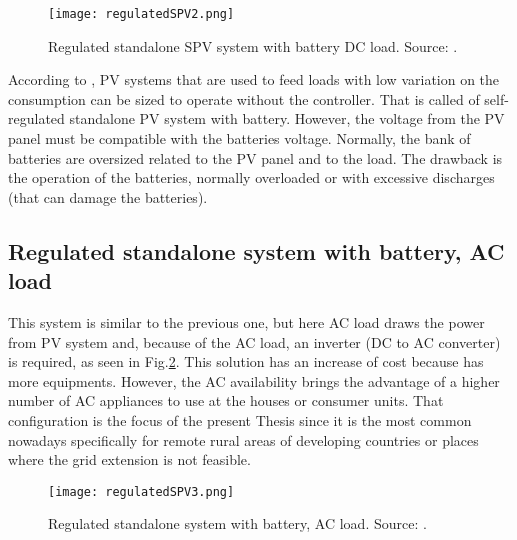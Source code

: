 \begin{figure}[h]
\texttt{[image: regulatedSPV2.png]}
\centering
\caption{Regulated standalone SPV system with battery DC load. Source: \cite{Roy}.}
\label{fig:regSPV2}
\end{figure}

According to \cite{Pinho}, PV systems that are used to feed loads with low variation on the consumption can be sized to operate without the controller. That is called of self-regulated standalone PV system with battery. However, the voltage from the PV panel must be compatible with the batteries voltage. Normally, the bank of batteries are oversized related to the PV panel and to the load. The drawback is the operation of the batteries, normally overloaded or with excessive discharges (that can damage the batteries).

\subsection{Regulated standalone system with battery, AC load}

This system is similar to the previous one, but here AC load draws the power from PV system and, because of the AC load, an inverter (DC to AC converter) is required, as seen in Fig.\ref{fig:regSPV3}. This solution has an increase of cost because has more equipments. However, the AC availability brings the advantage of a higher number of AC appliances to use at the houses or consumer units. That configuration is the focus of the present Thesis since it is the most common nowadays specifically for remote rural areas of developing countries or places where the grid extension is not feasible.

\begin{figure}[h]
\texttt{[image: regulatedSPV3.png]}
\centering
\caption{Regulated standalone system with battery, AC load. Source: \cite{Roy}.}
\label{fig:regSPV3}
\end{figure}

